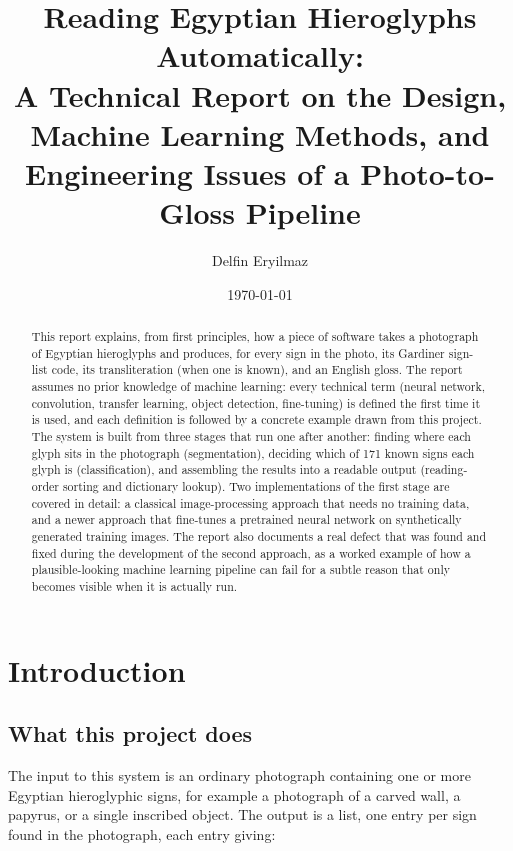 \documentclass[11pt,a4paper]{report}
\title{\textbf{Reading Egyptian Hieroglyphs Automatically:\\
A Technical Report on the Design, Machine Learning Methods, and\\
Engineering Issues of a Photo-to-Gloss Pipeline}}
\author{Delfin Eryilmaz}
\date{\today}
\begin{document}
\maketitle

\begin{abstract}
\noindent
This report explains, from first principles, how a piece of software takes a
photograph of Egyptian hieroglyphs and produces, for every sign in the photo,
its Gardiner sign-list code, its transliteration (when one is known), and an
English gloss. The report assumes no prior knowledge of machine learning: every
technical term (neural network, convolution, transfer learning, object
detection, fine-tuning) is defined the first time it is used, and each
definition is followed by a concrete example drawn from this project. The
system is built from three stages that run one after another: finding where
each glyph sits in the photograph (segmentation), deciding which of 171 known
signs each glyph is (classification), and assembling the results into a
readable output (reading-order sorting and dictionary lookup). Two
implementations of the first stage are covered in detail: a classical
image-processing approach that needs no training data, and a newer approach
that fine-tunes a pretrained neural network on synthetically generated
training images. The report also documents a real defect that was found and
fixed during the development of the second approach, as a worked example of
how a plausible-looking machine learning pipeline can fail for a subtle
reason that only becomes visible when it is actually run.
\end{abstract}

\tableofcontents

\chapter{Introduction}

\section{What this project does}

The input to this system is an ordinary photograph containing one or more
Egyptian hieroglyphic signs, for example a photograph of a carved wall, a
papyrus, or a single inscribed object. The output is a list, one entry per
sign found in the photograph, each entry giving:
\end{document}
